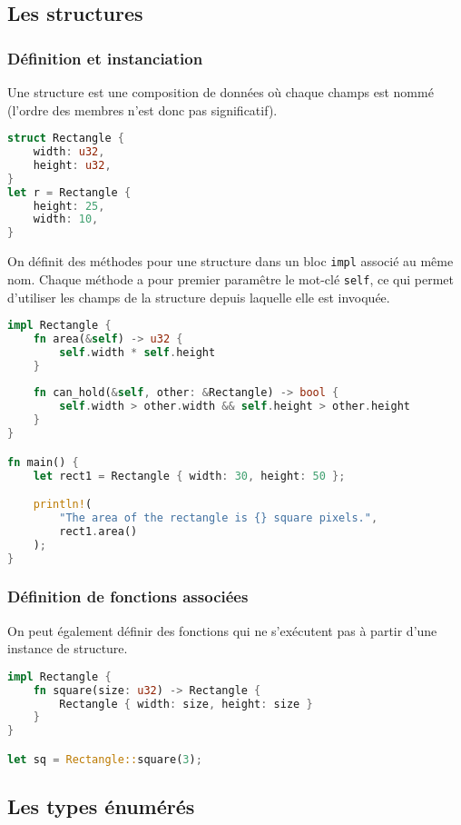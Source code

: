 \subsection{Les structures}

\begin{frame}[fragile]
  \frametitle{Définition et instanciation}
Une structure est une composition de données où chaque champs est nommé (l'ordre des membres n'est donc pas significatif).
  \begin{lstlisting}[language=rust]
struct Rectangle {
    width: u32,
    height: u32,
}
let r = Rectangle {
    height: 25,
    width: 10,
}
  \end{lstlisting}
\end{frame}

\begin{frame}[fragile]
On définit des méthodes pour une structure dans un bloc \texttt{impl} associé au même nom.
Chaque méthode a pour premier paramêtre le mot-clé \texttt{self}, ce qui permet d'utiliser les champs de la structure depuis laquelle elle est invoquée.
\begin{lstlisting}[language=rust, basicstyle=\tiny{}]
impl Rectangle {
    fn area(&self) -> u32 {
        self.width * self.height
    }
    
    fn can_hold(&self, other: &Rectangle) -> bool {
        self.width > other.width && self.height > other.height
    }
}

fn main() {
    let rect1 = Rectangle { width: 30, height: 50 };

    println!(
        "The area of the rectangle is {} square pixels.",
        rect1.area()
    );
}
\end{lstlisting}
\end{frame}

\begin{frame}[fragile]
  \frametitle{Définition de fonctions associées}
On peut également définir des fonctions qui ne s'exécutent pas à partir d'une instance de structure.
\begin{lstlisting}[language=rust]
impl Rectangle {
    fn square(size: u32) -> Rectangle {
        Rectangle { width: size, height: size }
    }
}

let sq = Rectangle::square(3);
\end{lstlisting}  
\end{frame}

\subsection{Les types énumérés}

